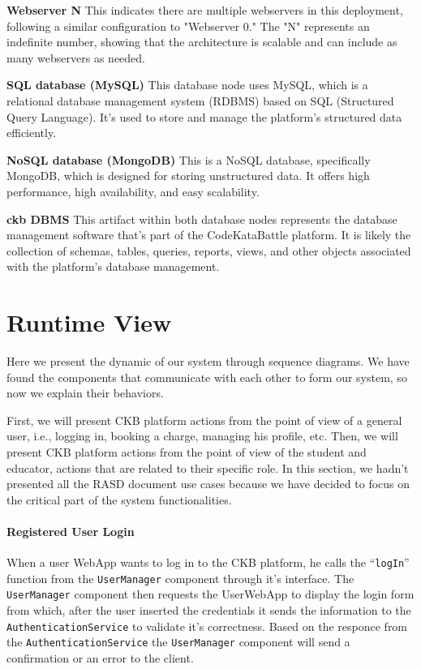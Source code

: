 \noindent\textbf{Webserver N}\newline
This indicates there are multiple webservers in this deployment, following a similar configuration to "Webserver 0." 
The "N" represents an indefinite number, showing that the architecture is scalable and can include as many webservers as needed.

\noindent\textbf{SQL database (MySQL)}\newline
This database node uses MySQL, which is a relational database management system (RDBMS) based on SQL (Structured Query Language). 
It's used to store and manage the platform's structured data efficiently.

\noindent\textbf{NoSQL database (MongoDB)}\newline
This is a NoSQL database, specifically MongoDB, which is designed for storing unstructured data. It offers high performance, high availability, and easy scalability.

\noindent\textbf{ckb DBMS}\newline
This artifact within both database nodes represents the database management software that's part of the CodeKataBattle platform. It is likely the collection of schemas, 
tables, queries, reports, views, and other objects associated with the platform's database management.

\section{Runtime View}
\label{sec:runtime_view}%
Here we present the dynamic of our system through sequence diagrams.
We have found the components that communicate with each other to form our system, so now we explain their behaviors.

First, we will present CKB platform actions from the point of view of a general user, i.e., logging in, booking a charge, managing his profile, etc.
Then, we will present CKB platform actions from the point of view of the student and educator, actions that are related to their specific role.
In this section, we hadn't presented all the RASD document use cases because we have decided to focus on the critical part of the system functionalities.

\paragraph{Registered User Login}
When a user WebApp wants to log in to the CKB platform, he calls the ``\verb|logIn|'' function from the \verb|UserManager| component through it's interface.
The \verb|UserManager| component then requests the UserWebApp to display the login form from which, after the user inserted the credentials it sends the information to the
\verb|AuthenticationService| to validate it's correctness. Based on the responce from the \verb|AuthenticationService| the \verb|UserManager| component will send a confirmation or an error to the client.

